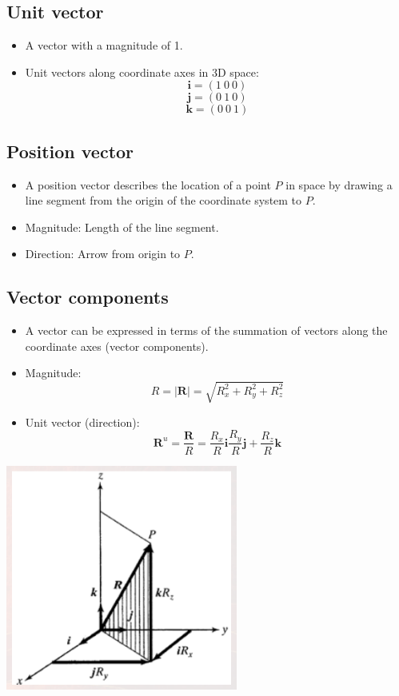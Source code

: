 \documentclass[11pt]{article}
\begin{document}
\subsection{Unit vector}
\label{sec:orgf82a49f}
\begin{itemize}
\item A vector with a magnitude of 1.
\item Unit vectors along coordinate axes in 3D space:
\[\boldsymbol{i} = (1 \ 0 \ 0)\]
\[\boldsymbol{j} = (0 \ 1 \ 0)\]
\[\boldsymbol{k} = (0 \ 0 \ 1)\]
\end{itemize}
\subsection{Position vector}
\label{sec:org9ed5fdb}
\begin{itemize}
\item A position vector describes the location of a point \(P\) in space by drawing a line segment from the origin of the coordinate system to \(P\).
\item Magnitude: Length of the line segment.
\item Direction: Arrow from origin to \(P\).
\end{itemize}
\subsection{Vector components}
\label{sec:org28e540a}
\begin{itemize}
\item A vector can be expressed in terms of the summation of vectors along the coordinate axes (vector components).
\item Magnitude:
\[R = |\boldsymbol{R}| = \sqrt{R_x^2 + R_y^2 + R_z^2}\]
\item Unit vector (direction):
\[\boldsymbol{R}^u = \frac{\boldsymbol{R}}{R} = \frac{R_x}{R} \boldsymbol{i} \frac{R_y}{R} \boldsymbol{j} + \frac{R_z}{R} \boldsymbol{k}\]
\end{itemize}

\begin{center}
\includegraphics[height=20em]{./images/vector-components.png}
\end{center}
\end{document}
